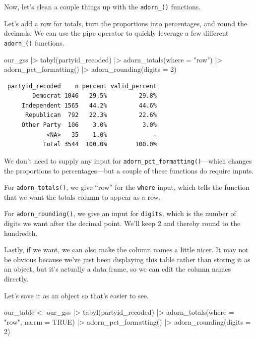 \documentclass[
  letterpaper,
  DIV=11,
  numbers=noendperiod]{scrreprt}
\newenvironment{Shaded}{\begin{snugshade}}{\end{snugshade}}
\newcommand{\AttributeTok}[1]{\textcolor[rgb]{0.40,0.45,0.13}{#1}}
\newcommand{\ConstantTok}[1]{\textcolor[rgb]{0.56,0.35,0.01}{#1}}
\newcommand{\DecValTok}[1]{\textcolor[rgb]{0.68,0.00,0.00}{#1}}
\newcommand{\FunctionTok}[1]{\textcolor[rgb]{0.28,0.35,0.67}{#1}}
\newcommand{\NormalTok}[1]{\textcolor[rgb]{0.00,0.23,0.31}{#1}}
\newcommand{\OtherTok}[1]{\textcolor[rgb]{0.00,0.23,0.31}{#1}}
\newcommand{\SpecialCharTok}[1]{\textcolor[rgb]{0.37,0.37,0.37}{#1}}
\newcommand{\StringTok}[1]{\textcolor[rgb]{0.13,0.47,0.30}{#1}}
\begin{document}
Now, let's clean a couple things up with the \texttt{adorn\_()}
functions.

Let's add a row for totals, turn the proportions into percentages, and
round the decimals. We can use the pipe operator to quickly leverage a
few different \texttt{adorn\_()} functions.

\begin{Shaded}
\begin{Highlighting}[]
\NormalTok{our\_gss }\SpecialCharTok{|\textgreater{}}
  \FunctionTok{tabyl}\NormalTok{(partyid\_recoded) }\SpecialCharTok{|\textgreater{}}
  \FunctionTok{adorn\_totals}\NormalTok{(}\AttributeTok{where =} \StringTok{"row"}\NormalTok{) }\SpecialCharTok{|\textgreater{}}
  \FunctionTok{adorn\_pct\_formatting}\NormalTok{() }\SpecialCharTok{|\textgreater{}}
  \FunctionTok{adorn\_rounding}\NormalTok{(}\AttributeTok{digits =} \DecValTok{2}\NormalTok{)}
\end{Highlighting}
\end{Shaded}

\begin{verbatim}
 partyid_recoded    n percent valid_percent
        Democrat 1046   29.5%         29.8%
     Independent 1565   44.2%         44.6%
      Republican  792   22.3%         22.6%
     Other Party  106    3.0%          3.0%
            <NA>   35    1.0%             -
           Total 3544  100.0%        100.0%
\end{verbatim}

We don't need to supply any input for
\texttt{adorn\_pct\_formatting()}---which changes the proportions to
percentages---but a couple of these functions do require inputs.

For \texttt{adorn\_totals()}, we give ``row'' for the \texttt{where}
input, which tells the function that we want the totals column to appear
as a row.

For \texttt{adorn\_rounding()}, we give an input for \texttt{digits},
which is the number of digits we want after the decimal point. We'll
keep 2 and thereby round to the hundredth.

Lastly, if we want, we can also make the column names a little nicer. It
may not be obvious because we've just been displaying this table rather
than storing it as an object, but it's actually a data frame, so we can
edit the column names directly.

Let's save it as an object so that's easier to see.

\begin{Shaded}
\begin{Highlighting}[]
\NormalTok{our\_table }\OtherTok{\textless{}{-}}\NormalTok{ our\_gss }\SpecialCharTok{|\textgreater{}}
  \FunctionTok{tabyl}\NormalTok{(partyid\_recoded) }\SpecialCharTok{|\textgreater{}}
  \FunctionTok{adorn\_totals}\NormalTok{(}\AttributeTok{where =} \StringTok{"row"}\NormalTok{, }\AttributeTok{na.rm =} \ConstantTok{TRUE}\NormalTok{) }\SpecialCharTok{|\textgreater{}}
  \FunctionTok{adorn\_pct\_formatting}\NormalTok{() }\SpecialCharTok{|\textgreater{}}
  \FunctionTok{adorn\_rounding}\NormalTok{(}\AttributeTok{digits =} \DecValTok{2}\NormalTok{)}
\end{Highlighting}
\end{Shaded}
\end{document}
